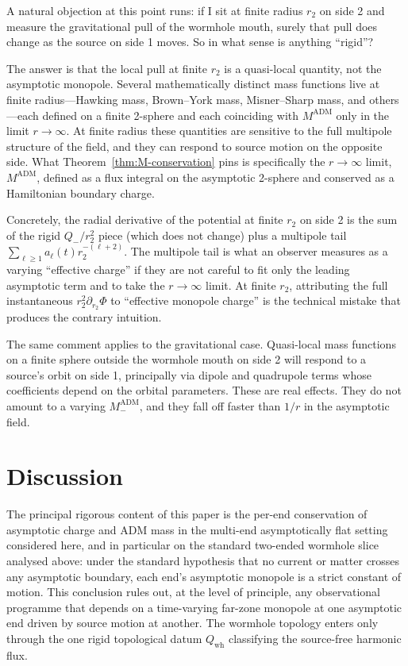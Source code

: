 \documentclass[aps,prd,onecolumn,nofootinbib,superscriptaddress]{revtex4-2}
\begin{document}
A natural objection at this point runs: if I sit at finite radius $r_2$ on side 2 and measure the gravitational pull of the wormhole mouth, surely that pull does change as the source on side 1 moves. So in what sense is anything ``rigid''?

The answer is that the local pull at finite $r_2$ is a quasi-local quantity, not the asymptotic monopole. Several mathematically distinct mass functions live at finite radius---Hawking mass, Brown--York mass, Misner--Sharp mass, and others---each defined on a finite 2-sphere and each coinciding with $M^{\mathrm{ADM}}$ only in the limit $r\to\infty$.\cite{Szabados2009Quasilocal} At finite radius these quantities are sensitive to the full multipole structure of the field, and they can respond to source motion on the opposite side. What Theorem~\ref{thm:M-conservation} pins is specifically the $r\to\infty$ limit, $M^{\mathrm{ADM}}$, defined as a flux integral on the asymptotic 2-sphere and conserved as a Hamiltonian boundary charge.

Concretely, the radial derivative of the potential at finite $r_2$ on side 2 is the sum of the rigid $Q_-/r_2^2$ piece (which does not change) plus a multipole tail $\sum_{\ell\ge 1} a_\ell(t) r_2^{-(\ell+2)}$. The multipole tail is what an observer measures as a varying ``effective charge'' if they are not careful to fit only the leading asymptotic term and to take the $r\to\infty$ limit. At finite $r_2$, attributing the full instantaneous $r_2^2 \partial_{r_2}\Phi$ to ``effective monopole charge'' is the technical mistake that produces the contrary intuition.

The same comment applies to the gravitational case. Quasi-local mass functions on a finite sphere outside the wormhole mouth on side 2 will respond to a source's orbit on side 1, principally via dipole and quadrupole terms whose coefficients depend on the orbital parameters. These are real effects. They do not amount to a varying $M_-^{\mathrm{ADM}}$, and they fall off faster than $1/r$ in the asymptotic field.

\section{Discussion}
\label{sec:discussion}

The principal rigorous content of this paper is the per-end conservation of asymptotic charge and ADM mass in the multi-end asymptotically flat setting considered here, and in particular on the standard two-ended wormhole slice analysed above: under the standard hypothesis that no current or matter crosses any asymptotic boundary, each end's asymptotic monopole is a strict constant of motion. This conclusion rules out, at the level of principle, any observational programme that depends on a time-varying far-zone monopole at one asymptotic end driven by source motion at another. The wormhole topology enters only through the one rigid topological datum $Q_{\mathrm{wh}}$ classifying the source-free harmonic flux.
\end{document}

